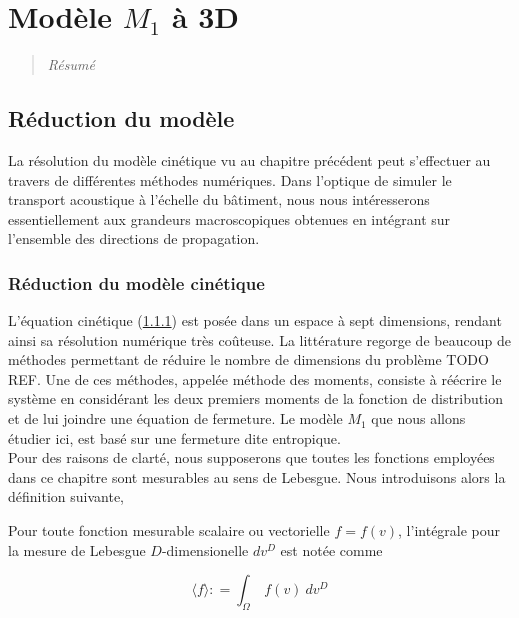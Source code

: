 \chapter{Modèle $M_1$ à 3D}
\label{chap:ch6}
\begin{quotation}
\textit{Résumé}
\end{quotation}
\minitoc
\newpage
 
  
\section{Réduction du modèle}
La résolution du modèle cinétique vu au chapitre précédent peut s'effectuer  au travers de différentes méthodes numériques. Dans l'optique de simuler le  transport acoustique à l'échelle du bâtiment, nous nous intéresserons  essentiellement aux grandeurs macroscopiques obtenues en intégrant sur l'ensemble des directions de propagation.

\subsection{Réduction du modèle cinétique}

L'équation cinétique (\ref{}) est posée dans un espace à sept dimensions,  rendant ainsi sa résolution numérique très coûteuse. La littérature regorge de beaucoup de méthodes permettant de réduire le nombre de dimensions du problème  TODO REF. Une de ces méthodes, appelée méthode des moments, consiste à réécrire le système en considérant les deux premiers moments de la fonction de  distribution et de lui joindre une équation de fermeture. Le modèle $M_1$ que  nous allons étudier ici, est basé sur une fermeture dite entropique. \\

Pour des raisons de clarté, nous supposerons que toutes les fonctions employées  dans ce chapitre sont mesurables au sens de Lebesgue. Nous introduisons alors la définition suivante,


\begin{definition}

  Pour toute fonction mesurable scalaire ou vectorielle $f=f(v)$, l'intégrale 
  pour la mesure de Lebesgue $D$-dimensionelle $dv^D$ est notée comme

  \begin{equation}
    \langle f \rangle : = \int_\Omega \ f(v)  \ dv^D
  \end{equation} 

\end{definition}

